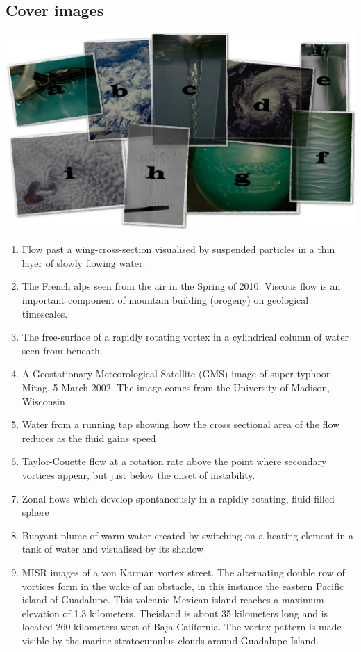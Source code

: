 \documentclass[10pt]{report}
\begin{document}
\subsection*{Cover images}
\begin{center}
{\includegraphics[width=0.5\linewidth]{FrontPage.003.png}}
\end{center}
\begin{enumerate}[label=\alph{enumi} --- ] %
	\footnotesize
\item  Flow past a wing-cross-section visualised by suspended
		particles in a thin layer of slowly flowing water.
\item  The French alps seen from the air in the Spring of 2010.
	   Viscous flow is an important component of mountain building (orogeny)
       on geological timescales.
\item  The free-surface of a rapidly rotating vortex in a cylindrical column
       of water seen from beneath.
\item  A Geostationary Meteorological Satellite (GMS) image of super typhoon Mitag,
 	   5 March 2002. The image comes from the University of Madison, Wisconsin
\item  Water from a running tap showing how the cross sectional
       area of the flow reduces as the fluid gains speed
\item  Taylor-Couette flow at a rotation rate above the point where secondary vortices
       appear, but just below the onset of instability.
\item  Zonal flows which develop spontaneously in a rapidly-rotating, fluid-filled sphere

\item  Buoyant plume of warm water created by switching on a heating element in a tank of water and visualised by its shadow

\item  MISR images of a von Karman vortex street. The alternating double row of vortices form in the wake of an obstacle, in this instance the eastern Pacific island of Guadalupe. This volcanic Mexican island reaches a maximum elevation of 1.3 kilometers. Theisland is about 35 kilometers long and is located 260 kilometers west of Baja California. The vortex pattern is made visible by the marine stratocumulus clouds around Guadalupe Island.
\end{enumerate}
\end{document}
